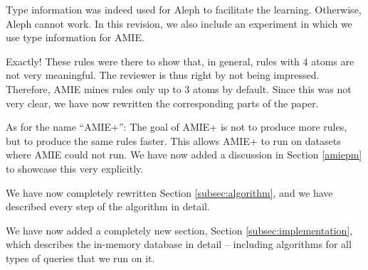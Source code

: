       Type information was indeed used for Aleph to facilitate the learning. Otherwise, Aleph cannot work.
      In this revision, we also include an experiment in which we use type information for AMIE.




Exactly! These rules were there to show that, in general, rules with 4 atoms are not very meaningful. The reviewer is thus right by not being impressed. Therefore, AMIE mines rules only up to 3 atoms by default. Since this was not very clear, we have now rewritten the corresponding parts of the paper.

As for the name ``AMIE+'': The goal of AMIE+ is not to produce more rules, but to produce the same rules faster. This allows AMIE+ to run on datasets where AMIE could not run. We have now added a discussion in Section \ref{amiepm} to showcase this very explicitly.



We have now completely rewritten Section \ref{subsec:algorithm}, and we have described every step of the algorithm in detail.


We have now added a completely new section, Section \ref{subsec:implementation}, which describes the in-memory database in detail -- including algorithms for all types of queries that we run on it.


